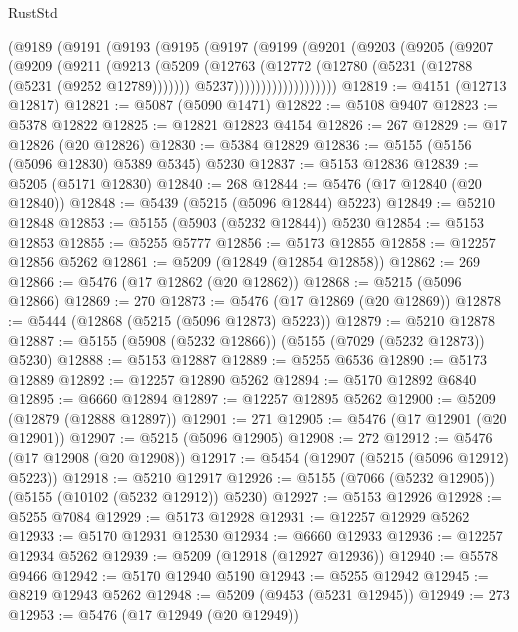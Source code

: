 \begin{lexlean}{RustStd}
\begin{coremodule}
              (@9189
                (@9191
                  (@9193
                    (@9195
                      (@9197
                        (@9199
                          (@9201
                            (@9203
                              (@9205
                                (@9207
                                  (@9209
                                    (@9211
                                      (@9213
                                        (@5209
                                          (@12763
                                            (@12772
                                              (@12780 (@5231 (@12788 (@5231 (@9252 @12789)))))))
                                          @5237)))))))))))))))))))
@12819 := @4151 (@12713 @12817)
@12821 := @5087 (@5090 @1471)
@12822 := @5108 @9407
@12823 := @5378 @12822
@12825 := @12821 @12823 @4154
@12826 := 267
@12829 := @17 @12826 (@20 @12826)
@12830 := @5384 @12829
@12836 := @5155 (@5156 (@5096 @12830) @5389 @5345) @5230
@12837 := @5153 @12836
@12839 := @5205 (@5171 @12830)
@12840 := 268
@12844 := @5476 (@17 @12840 (@20 @12840))
@12848 := @5439 (@5215 (@5096 @12844) @5223)
@12849 := @5210 @12848
@12853 := @5155 (@5903 (@5232 @12844)) @5230
@12854 := @5153 @12853
@12855 := @5255 @5777
@12856 := @5173 @12855
@12858 := @12257 @12856 @5262
@12861 := @5209 (@12849 (@12854 @12858))
@12862 := 269
@12866 := @5476 (@17 @12862 (@20 @12862))
@12868 := @5215 (@5096 @12866)
@12869 := 270
@12873 := @5476 (@17 @12869 (@20 @12869))
@12878 := @5444 (@12868 (@5215 (@5096 @12873) @5223))
@12879 := @5210 @12878
@12887 := @5155 (@5908 (@5232 @12866)) (@5155 (@7029 (@5232 @12873)) @5230)
@12888 := @5153 @12887
@12889 := @5255 @6536
@12890 := @5173 @12889
@12892 := @12257 @12890 @5262
@12894 := @5170 @12892 @6840
@12895 := @6660 @12894
@12897 := @12257 @12895 @5262
@12900 := @5209 (@12879 (@12888 @12897))
@12901 := 271
@12905 := @5476 (@17 @12901 (@20 @12901))
@12907 := @5215 (@5096 @12905)
@12908 := 272
@12912 := @5476 (@17 @12908 (@20 @12908))
@12917 := @5454 (@12907 (@5215 (@5096 @12912) @5223))
@12918 := @5210 @12917
@12926 := @5155 (@7066 (@5232 @12905)) (@5155 (@10102 (@5232 @12912)) @5230)
@12927 := @5153 @12926
@12928 := @5255 @7084
@12929 := @5173 @12928
@12931 := @12257 @12929 @5262
@12933 := @5170 @12931 @12530
@12934 := @6660 @12933
@12936 := @12257 @12934 @5262
@12939 := @5209 (@12918 (@12927 @12936))
@12940 := @5578 @9466
@12942 := @5170 @12940 @5190
@12943 := @5255 @12942
@12945 := @8219 @12943 @5262
@12948 := @5209 (@9453 (@5231 @12945))
@12949 := 273
@12953 := @5476 (@17 @12949 (@20 @12949))

\end{coremodule}
\end{lexlean}
